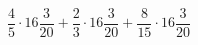 \begin{ex}[type=calculate_rational]
	\begin{condition}
		\( \dfrac{4}{5}\cdot16\dfrac{3}{20}+\dfrac{2}{3}\cdot16\dfrac{3}{20}+\dfrac{8}{15}\cdot16\dfrac{3}{20} \)
	\end{condition}
	\answer{}
\end{ex}